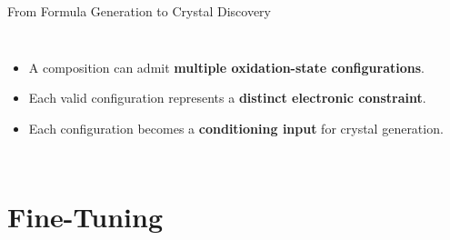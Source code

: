 \documentclass[aspectratio=169, 11pt]{beamer}
\begin{document}
\begin{frame}{From Formula Generation to Crystal Discovery}
\begin{columns}[T]
{\begin{itemize}
            \item A composition can admit
            \textbf{multiple oxidation-state configurations}.

            \item Each valid configuration represents a
            \textbf{distinct electronic constraint}.

            \item Each configuration becomes a
            \textbf{conditioning input} for crystal generation.
        \end{itemize}
        }

    \end{columns}

    \vfill

\end{frame}


\section{Fine-Tuning}
\end{document}
